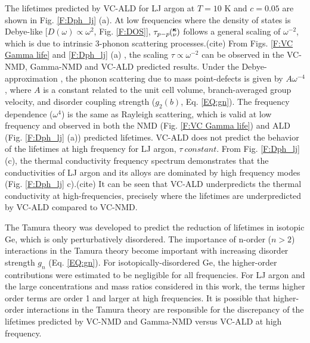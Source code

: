 \documentclass[aps,prb,onecolumn,preprint,superscriptaddress,amsmath,amssymb,floatfix]{revtex4}
\newcommand{\kv}{\mspace{-4.0mu}\left(\mspace{-8.0mu}
\begin{smallmatrix}&\pmb{\kappa} \\&\nu\end{smallmatrix}
\mspace{-3.0mu}\right)}
\begin{document}
The lifetimes predicted by VC-ALD for LJ argon at $T=10$ K and 
$c=0.05$ are shown in Fig. \ref{F:Dph_lj} (a).  
At low frequencies where the density of states is Debye-like 
[$D(\omega) \propto \omega^{2}$, Fig. \ref{F:DOS}], 
$\tau_{p-p}\kv$ follows a general scaling of $\omega^{-2}$, which is due 
to intrinsic 3-phonon scattering processes.(cite)  
From Figs. \ref{F:VC Gamma life} and \ref{F:Dph_lj} (a) , 
the scaling $\tau \propto \omega^{-2}$ can be 
observed  
in the VC-NMD, Gamma-NMD and VC-ALD predicted results. 
Under the Debye-approximation , 
the phonon scattering due to mass point-defects 
is given by $A\omega^{-4}$, where $A$ is a constant related to the unit 
cell volume, branch-averaged group velocity, and disorder coupling strength 
($g_2(b)$, Eq. \eqref{EQ:gn}). 
The frequency dependence ($\omega^4$) is the same as 
Rayleigh scattering, which is valid at low frequency and observed 
in both the NMD (Fig. \ref{F:VC Gamma life}) and ALD 
(Fig. \ref{F:Dph_lj} (a)) predicted lifetimes. 
VC-ALD does not predict the behavior of the lifetimes at high frequency 
for LJ argon, $\tau ~ constant$. From Fig. \ref{F:Dph_lj} (c), the thermal 
conductivity frequency spectrum demonstrates that the conductivities of 
LJ argon and its alloys are dominated by high frequency modes 
(Fig. \ref{F:Dph_lj} c).(cite) It can be seen that VC-ALD underpredicts 
the thermal conductivity at high-frequencies, precisely where the lifetimes 
are underpredicted by VC-ALD compared to VC-NMD.


The Tamura theory was developed to predict the reduction of lifetimes 
in isotopic Ge, which is only perturbatively disordered. 
The importance of n-order ($n > 2$) interactions in the 
Tamura theory become important with increasing disorder strength 
$g_n$ (Eq. \eqref{EQ:gn}).\cite{tamura_isotope_1983} 
For isotopically-disordered Ge, the higher-order contributions 
were estimated to be negligible for all 
frequencies.\cite{tamura_isotope_1983} 
For LJ argon and the large concentrations and mass ratios considered 
in this work, the terms higher order terms are order 1 and larger at high 
frequencies. It is possible that 
higher-order interactions in the Tamura theory 
are responsible for the 
discrepancy of the lifetimes predicted by VC-NMD and Gamma-NMD 
versus VC-ALD at high frequency.
\end{document}
